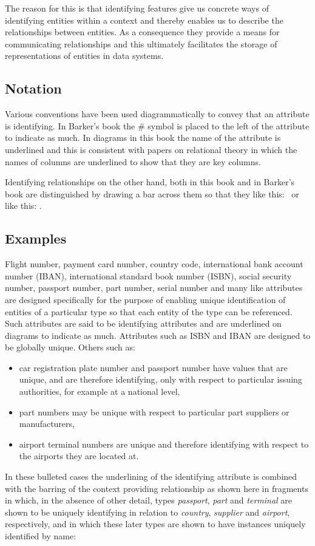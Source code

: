 \mynote
The reason for this is that identifying features give us concrete ways of identifying entities within a context and thereby enables us to describe the relationships between entities. As a consequence they provide a means for communicating  relationships and this ultimately facilitates the storage of representations of entities in data systems.

\subsection{Notation}
 \mynote
Various conventions have been used diagrammatically to convey that an attribute is identifying. In Barker's book the \# symbol is placed to the left of the attribute to indicate as much. In diagrams in this book the name of the attribute is underlined and this is consistent with papers on relational theory in which  the names of columns are underlined to show that they are key columns.

\mynote Identifying relationships on the other hand, both in this book and in Barker's book 
are distinguished by drawing a bar across them so that they like this: \barkerEllisJ\ or like this: \barkerEllisK.

 
\subsection{Examples}
\mynote
Flight number, payment card number, country code, international bank account number (IBAN), 
international standard book number (ISBN), social security number, passport number, part number, serial number and many like attributes are designed specifically for the purpose of enabling unique identification of entities of a particular type so that each entity of the type can be referenced. Such attributes are said to be identifying attributes and are underlined 
on diagrams to indicate as much. Attributes 
such as ISBN and IBAN are designed to be globally unique.  
Others such as:
\begin{itemize}
\item
car registration plate number and passport number have values that are unique, and are therefore identifying, only with respect to particular issuing authorities, for example at a national level,
\item part numbers may be unique with respect to particular part suppliers or manufacturers,
\item airport terminal numbers are unique and therefore identifying with respect to the airports they are located at.
\end{itemize}
In these bulleted cases the underlining of the identifying attribute is combined with the barring of the context providing relationship as shown here in fragments in which, in the absence of other detail, types \textit{passport}, \textit{part} and \textit{terminal} are shown to be uniquely identifying  in relation
to \textit{country}, \textit{supplier} and \textit{airport}, respectively, 
and in which these later types are shown to have instances uniquely identified by name:


